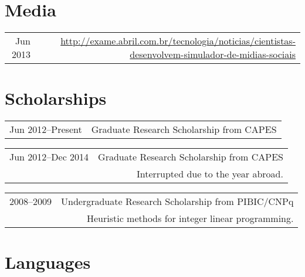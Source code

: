 \documentclass[a4paper,10pt]{article}
\begin{document}

\section{Media}

\begin{tabularx}{\textwidth}{D|R}
Jun 2013        & \footnotesize \url{http://exame.abril.com.br/tecnologia/noticias/cientistas-desenvolvem-simulador-de-midias-sociais}\\
\end{tabularx}


\section{Scholarships}

\begin{tabularx}{\textwidth}{D|R}
Jun 2012--Present    & Graduate Research Scholarship from CAPES\\
\end{tabularx}

\begin{tabularx}{\textwidth}{D|R}
Jun 2012--Dec 2014   & Graduate Research Scholarship from CAPES\\
                    & \footnotesize Interrupted due to the year abroad.\\
\end{tabularx}

\begin{tabularx}{\textwidth}{D|R}
2008--2009   & Undergraduate Research Scholarship from PIBIC/CNPq\\
            & \footnotesize Heuristic methods for integer linear programming.\\
\end{tabularx}


\section{Languages}
\end{document}
